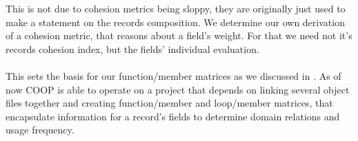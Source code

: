 This is not due to cohesion metrics being sloppy, they are originally just used to make a statement on the records composition. We determine our own derivation of a cohesion metric, that reasons about a field's weight. For that we need not it's records cohesion index, but the fields' individual evaluation.\\\\
This sets the basis for our function/member matrices as we discussed in . As of now COOP is able to operate on a project that depends on linking several object files together and creating function/member and loop/member matrices, that encapsulate information for a record's fields to determine domain relations and usage frequency.


